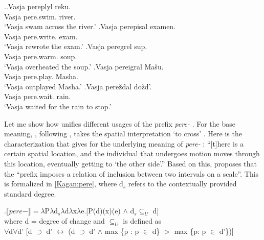 \ex.\label{ex:pere}\ag.\label{ex:pere:cross}Vasja pereplyl reku.\\
Vasja pere.swim. river.\\
\trans `Vasja swam across the river.'
\bg.\label{ex:pere:redo}Vasja perepisal examen.\\
Vasja pere.write. exam.\\
\trans `Vasja rewrote the exam.'
\bg.\label{ex:pere:excess \index{prefix interpretation!excessive}}Vasja peregrel sup.\\
Vasja pere.warm. soup.\\
\trans `Vasja overheated the soup.'
\bg.\label{ex:pere:comparison \index{prefix interpretation!comparison}}Vasja pereigral Ma\v{s}u.\\
Vasja pere.play. Masha.\\
\trans `Vasja outplayed Masha.'
\bg.\label{ex:pere:time}Vasja pere\v{z}dal do\v{z}d'.\\
Vasja pere.wait. rain.\\
\trans `Vasja waited for the rain to stop.'

Let me show how \citet{Kagan:book} unifies different usages of the prefix \textit{pere-}  . For the base meaning, \citet[120--121]{Kagan:book}, following \citet{Janda:88}, takes the spatial  interpretation `to cross' . Here is the characterization that \citet[121]{Kagan:book} gives for the underlying meaning of \textit{pere-}  : ``[t]here is a certain spatial  location, and the individual that undergoes motion moves through this location, eventually getting to `the other side'.'' Based on this, \citet[122]{Kagan:book} proposes that the ``prefix imposes a relation of inclusion between two intervals on a scale''. This is formalized in \ref{Kagan:pere}, where d$_s$ refers to the contextually provided   standard degree.

\ex.\label{Kagan:pere}$\llbracket pere- \rrbracket = \lambda$P$\lambda$d$_s\lambda$d$\lambda$x$\lambda$e.[P(d)(x)(e) $\wedge$ d$_s \subseteq _U$ d]\\
where d = degree of change \citep{KennedyLevin:02} and $\subseteq _U$ is defined as\\
$\forall$d$\forall$d' [d $\supset$ d' $\leftrightarrow$ (d $\supset$ d' $\wedge$ max \{p : p $\in$ d\} $>$ max \{p: p $\in$ d'\})]\\

